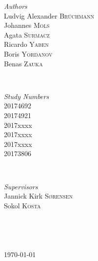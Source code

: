 \begin{titlepage}
	\begin{minipage}{0.4\textwidth}
		\begin{flushleft} \large
			\emph{Authors}\\
			Ludvig Alexander \textsc{Brüchmann} \\
			Johannes \textsc{Mols} \\
			Agata \textsc{Surmacz} \\
			Ricardo \textsc{Yaben} \\
			Boris \textsc{Yordanov} \\
			Benas \textsc{Zauka} \\
		\end{flushleft}
	\end{minipage}
	~
	\begin{minipage}{0.4\textwidth}
		\begin{flushright} \large
			\emph{Study Numbers} \\
			20174692 \\
			20174921 \\
			2017xxxx \\
			2017xxxx \\
			2017xxxx \\
			20173806 \\
		\end{flushright}
	\end{minipage}\\[0.5cm]
	 
	 
	\begin{minipage}{0.4\textwidth}
		\begin{flushleft} \large
			\emph{Supervisors}\\
			Jannick Kirk \textsc{Sørensen} \\
			Sokol \textsc{Kosta} \\
		\end{flushleft}
	\end{minipage}
	~
	\begin{minipage}{0.4\textwidth}
		\begin{flushright} \large
		\end{flushright}
	\end{minipage}\\[0.5cm]
	
		
	\vfill\vfill\vfill %
		
	{\large\today} %
			
\end{titlepage}